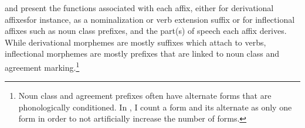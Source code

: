  and   present the functions associated with each affix, either for derivational affixes{\textemdash}for instance, as a nominalization or verb extension suffix{\textemdash} or for inflectional affixes such as noun class prefixes,  and the part(s) of speech each affix derives.
While derivational morphemes are mostly suffixes which attach to verbs, inflectional morphemes are mostly prefixes that are linked to noun class and agreement marking.\footnote{Noun class and agreement prefixes often have alternate forms that are phonologically conditioned. In , I count a form and its alternate as only one form in order to not artificially increase the number of forms.} 



\begin{table}
\end{table}
